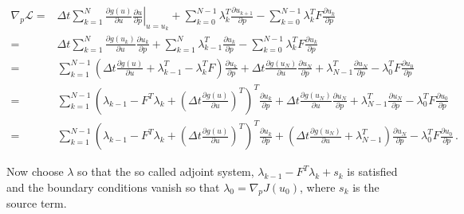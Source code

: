 \documentclass[10pt]{article}
\newcommand{\dt}{\Delta t}
\newcommand{\CostFcn}{J}
\newcommand{\CostIntegrand}{g}
\newcommand{\param}{p}
\newcommand{\ModelTLM}{F}
\newcommand{\Lagrangian}{{\mathcal{L}}}
\begin{document}
\begin{allowdisplaybreaks}
\begin{align}
  \nonumber
  \nabla_\param
  \Lagrangian =&\dt \sum_{k=1}^{N} \left.
  \frac{\partial
  \CostIntegrand(u)}{\partial u}\frac{\partial u}{\partial \param}
  \right|_{u=u_k}
+ \sum_{k=0}^{N-1} \lambda_k^T \frac{\partial u_{k+1}}{\partial
  \param}  - \sum_{k=0}^{N-1}
\lambda_k^T \ModelTLM \frac{\partial u_{k}}{\partial \param}
\\
\nonumber
=& \dt\sum_{k=1}^{N}  
\frac{\partial
  \CostIntegrand(u_k)}{\partial u} \frac{\partial u_k}{\partial \param}+
\sum_{k=1}^{N} \lambda_{k-1}^T \frac{\partial u_{k}}{\partial \param}
- \sum_{k=0}^{N-1} \lambda_k^T \ModelTLM \frac{\partial
  u_{k}}{\partial \param}
\\
\nonumber
=&\sum_{k=1}^{N-1}  \left(  \dt \frac{\partial
  \CostIntegrand(u)}{\partial u}  +  \lambda_{k-1}^T  -  \lambda_k^T
\ModelTLM \right) \frac{\partial u_{k}}{\partial \param} + \dt \frac{\partial
  \CostIntegrand(u_N)}{\partial u} \frac{\partial u_{N}}{\partial
  \param} +  \lambda_{N-1}^T \frac{\partial u_{N}}{\partial \param} -
\lambda_0^T \ModelTLM \frac{\partial   u_{0}}{\partial \param}
\\
\nonumber
=&\sum_{k=1}^{N-1}  \left(     \lambda_{k-1}   -  \ModelTLM^T
\lambda_k +\left(\dt\frac{\partial
  \CostIntegrand(u)}{\partial u}\right)^T \right)^T \frac{\partial u_{k}}{\partial \param} + \dt \frac{\partial
  \CostIntegrand(u_N)}{\partial u} \frac{\partial u_{N}}{\partial
  \param} +  \lambda_{N-1}^T \frac{\partial u_{N}}{\partial \param} -
\lambda_0^T \ModelTLM \frac{\partial   u_{0}}{\partial \param}
\\
\nonumber
=&\sum_{k=1}^{N-1}  \left(     \lambda_{k-1}   -  \ModelTLM^T
\lambda_k + \left(\dt\frac{\partial
  \CostIntegrand(u)}{\partial u}\right)^T \right)^T \frac{\partial
  u_{k}}{\partial \param} + \left(\dt \frac{\partial 
  \CostIntegrand(u_N)}{\partial u}  +  \lambda_{N-1}^T\right)
\frac{\partial u_{N}}{\partial \param} - 
\lambda_0^T \ModelTLM \frac{\partial u_{0}}{\partial \param}\,.
\end{align}
\end{allowdisplaybreaks}
%
Now choose $\lambda$ so that the so called adjoint system, $\lambda_{k-1}   -  \ModelTLM^T
\lambda_k + s_k$ is satisfied and the boundary conditions vanish so
that $\lambda_0 = \nabla_\param \CostFcn(u_0)$, where $s_k$ is the
source term.
\end{document}
